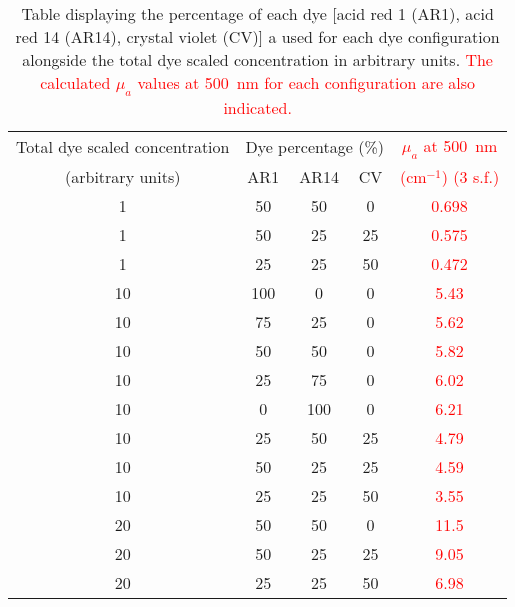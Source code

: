\begin{table}[ht!]
    \centering
    \caption{Table displaying the 
    percentage of each 
    dye [acid red 1 (AR1), acid red 14 (AR14), crystal violet (CV)] a used for each dye configuration alongside the total dye scaled concentration in arbitrary units. \textcolor{red}{The calculated $\mu_a$ values at 500~nm for each configuration are also indicated.}}
    \begin{tabular}{|c|c|c|c|c|}
        \hline
        Total dye scaled concentration & \multicolumn{3}{|c|}{Dye 
        percentage (\%)
        } & \textcolor{red}{$\mu_a$ at 500~nm} \\
        (arbitrary units) & AR1 & AR14 & CV & \textcolor{red}{(cm$^{-1}$) (3 s.f.)} \\
        \hline
        1 & 50 & 50 & 0 & \textcolor{red}{0.698} \\
        1 & 50 & 25 & 25 & \textcolor{red}{0.575} \\
        1 & 25 & 25 & 50 & \textcolor{red}{0.472} \\
        10 & 100 & 0 & 0 & \textcolor{red}{5.43} \\
        10 & 75 & 25 & 0 & \textcolor{red}{5.62} \\
        10 & 50 & 50 & 0 & \textcolor{red}{5.82} \\
        10 & 25 & 75 & 0 & \textcolor{red}{6.02} \\
        10 & 0 & 100 & 0 & \textcolor{red}{6.21} \\
        10 & 25 & 50 & 25 & \textcolor{red}{4.79} \\
        10 & 50 & 25 & 25 & \textcolor{red}{4.59} \\
        10 & 25 & 25 & 50 & \textcolor{red}{3.55} \\
        20 & 50 & 50 & 0 & \textcolor{red}{11.5} \\
        20 & 50 & 25 & 25 & \textcolor{red}{9.05} \\
        20 & 25 & 25 & 50 & \textcolor{red}{6.98} \\
        \hline
    \end{tabular}
    \label{tb:phantomratios} %
\end{table}


